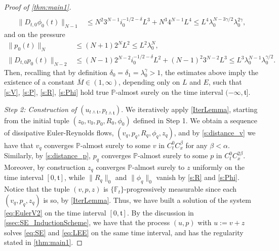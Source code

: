 \documentclass[10pt,a4paper]{amsart}
\numberwithin{equation}{section}
\numberwithin{corollario}{section}
\numberwithin{lemma}{section}
\numberwithin{prop}{section}
\theoremstyle{definition}
\theoremstyle{remark}
\begin{document}
\begin{proof}[Proof of \autoref{thm:main1}]
\begin{align}
    \\
    \|D_{t,0}\phi_0(t)\|_{N-1}
    &\leq 
    N^2 3^{N-1} i_0^{-1/2-\delta} L^3
    +
    N^3 4^{N-1} L^4\le L^4 \lambda_0^{N-3\gamma/2} \lambda_0^{2\gamma},
    \end{align}
    and on the pressure
    \begin{align}
    \|p_0(t)\|_N
    &\leq 
    (N+1)2^N L^2\le L^2\lambda_0^{N},
    \\
    \|D_{t,0}p_0(t)\|_{N-2}
    &\le 
    (N-1)2^{N-2} i_0^{-1/2-\delta}L^2
    +
    (N-1)^2 3^{N-2}L^3
    \le 
    L^3 \lambda_0^{N-1}\lambda_0^{\gamma/2}.
\end{align}
Then, recalling that by definition $\delta_0 = \delta_1 = \lambda_0^\gamma>1$, the estimates above imply the existence of a constant $\overline{M} \in (1,\infty)$, depending only on $L$ and $E$, such that \eqref{s:V}, \eqref{s:P}, \eqref{s:R}, \eqref{s:Phi} hold true $\mathbb{P}$-almost surely on the time interval $(-\infty,\mathfrak{t}]$.

\textit{Step 2: Construction of $(u_{t\wedge\mathfrak{t}},p_{t\wedge\mathfrak{t}})$}.
We iteratively apply \autoref{IterLemma}, starting from the initial tuple $(z_0,v_0,p_0,R_0,\phi_0)$ defined in Step 1. 
We obtain a sequence of dissipative Euler-Reynolds flows, $(v_q,p_q,R_q,\phi_q,z_q)$, and by \eqref{s:distance_v} we have that $v_q$ converges $\mathbb{P}$-almost surely to some $v$ in $C_t^0C^{\beta}_x$ for any $\beta<\alpha$.
Similarly, by \eqref{s:distance_p}, $p_q$ converges $\mathbb{P}$-almost surely to some $p$ in $C_t^0C^{2\beta}_x$.
Moreover, by construction $z_q$ converges $\mathbb{P}$-almost surely to $z$ uniformly on the time interval $[0,\mathfrak{t}]$, while $\|R_q\|_0$ and $\|\phi_q\|_0$ vanish by \eqref{s:R} and \eqref{s:Phi}. 
Notice that the tuple $(v,p,z)$ is $\{\mathbb{F}_t\}$-progressively measurable since each $(v_q,p_q,z_q)$ is so, by \autoref{IterLemma}. Thus, we have built a solution of the system \eqref{eq:EulerV2} on the time interval $[0,\mathfrak{t}]$. By the discussion in \autoref{ssec:SE_InductionScheme}, we have that the process $(u,p)$ with $u:=v+z$ solves \eqref{eq:SE} and \eqref{eq:LEE} on the same time interval, and has the regularity stated in \autoref{thm:main1}.


\end{proof}
\end{document}
